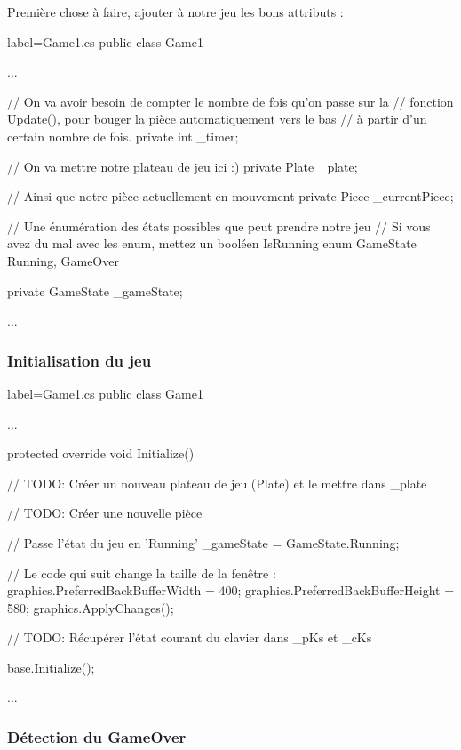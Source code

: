 \documentclass[a4paper]{article}
\begin{document}
Première chose à faire, ajouter à notre jeu les bons attributs :

\begin{csharpcode*}{label=Game1.cs}
public class Game1
{
    ...

    // On va avoir besoin de compter le nombre de fois qu'on passe sur la
    // fonction Update(), pour bouger la pièce automatiquement vers le bas
    // à partir d'un certain nombre de fois.
    private int _timer;

    // On va mettre notre plateau de jeu ici :)
    private Plate _plate;

    // Ainsi que notre pièce actuellement en mouvement
    private Piece _currentPiece;

    // Une énumération des états possibles que peut prendre notre jeu
    // Si vous avez du mal avec les enum, mettez un booléen IsRunning
    enum GameState { Running, GameOver }

    private GameState _gameState;

    ...
}
\end{csharpcode*}

\subsubsection{Initialisation du jeu}

\begin{csharpcode*}{label=Game1.cs}
public class Game1
{
    ...

    protected override void Initialize()
    {
        // TODO: Créer un nouveau plateau de jeu (Plate) et le mettre dans _plate
        
        // TODO: Créer une nouvelle pièce
        
        // Passe l'état du jeu en 'Running'
        _gameState = GameState.Running;

        // Le code qui suit change la taille de la fenêtre :
        graphics.PreferredBackBufferWidth = 400;
        graphics.PreferredBackBufferHeight = 580;
        graphics.ApplyChanges();

        // TODO: Récupérer l'état courant du clavier dans _pKs et _cKs

        base.Initialize();
    }

    ...
}
\end{csharpcode*}

\subsubsection{Détection du GameOver}
\end{document}

